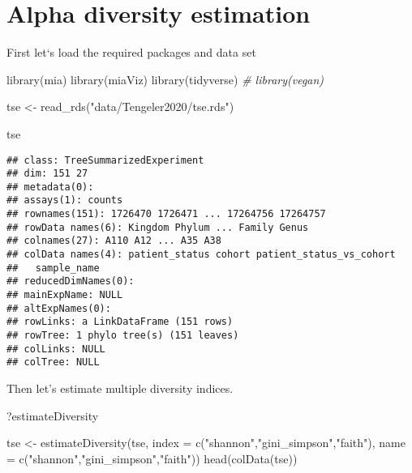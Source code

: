 \documentclass[
  oneside]{book}
\newenvironment{Shaded}{\begin{snugshade}}{\end{snugshade}}
\newcommand{\AttributeTok}[1]{\textcolor[rgb]{0.77,0.63,0.00}{#1}}
\newcommand{\CommentTok}[1]{\textcolor[rgb]{0.56,0.35,0.01}{\textit{#1}}}
\newcommand{\FunctionTok}[1]{\textcolor[rgb]{0.00,0.00,0.00}{#1}}
\newcommand{\NormalTok}[1]{#1}
\newcommand{\OtherTok}[1]{\textcolor[rgb]{0.56,0.35,0.01}{#1}}
\newcommand{\StringTok}[1]{\textcolor[rgb]{0.31,0.60,0.02}{#1}}
\begin{document}
\hypertarget{alpha-diversity-estimation}{%
\section{Alpha diversity estimation}\label{alpha-diversity-estimation}}

First let`s load the required packages and data set

\begin{Shaded}
\begin{Highlighting}[]
\FunctionTok{library}\NormalTok{(mia)}
\FunctionTok{library}\NormalTok{(miaViz)}
\FunctionTok{library}\NormalTok{(tidyverse)}
\CommentTok{\# library(vegan)}

\NormalTok{tse }\OtherTok{\textless{}{-}} \FunctionTok{read\_rds}\NormalTok{(}\StringTok{"data/Tengeler2020/tse.rds"}\NormalTok{)}

\NormalTok{tse}
\end{Highlighting}
\end{Shaded}

\begin{verbatim}
## class: TreeSummarizedExperiment 
## dim: 151 27 
## metadata(0):
## assays(1): counts
## rownames(151): 1726470 1726471 ... 17264756 17264757
## rowData names(6): Kingdom Phylum ... Family Genus
## colnames(27): A110 A12 ... A35 A38
## colData names(4): patient_status cohort patient_status_vs_cohort
##   sample_name
## reducedDimNames(0):
## mainExpName: NULL
## altExpNames(0):
## rowLinks: a LinkDataFrame (151 rows)
## rowTree: 1 phylo tree(s) (151 leaves)
## colLinks: NULL
## colTree: NULL
\end{verbatim}

Then let's estimate multiple diversity indices.

\begin{Shaded}
\begin{Highlighting}[]
\NormalTok{?estimateDiversity}

\NormalTok{tse }\OtherTok{\textless{}{-}} \FunctionTok{estimateDiversity}\NormalTok{(tse, }
                              \AttributeTok{index =} \FunctionTok{c}\NormalTok{(}\StringTok{"shannon"}\NormalTok{,}\StringTok{"gini\_simpson"}\NormalTok{,}\StringTok{"faith"}\NormalTok{),}
                              \AttributeTok{name =} \FunctionTok{c}\NormalTok{(}\StringTok{"shannon"}\NormalTok{,}\StringTok{"gini\_simpson"}\NormalTok{,}\StringTok{"faith"}\NormalTok{))}
\FunctionTok{head}\NormalTok{(}\FunctionTok{colData}\NormalTok{(tse))}
\end{Highlighting}
\end{Shaded}
\end{document}
